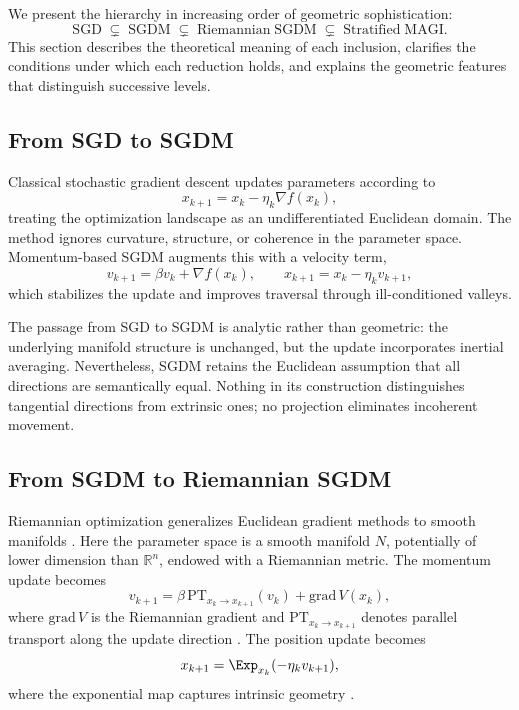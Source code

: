 \documentclass[12pt]{article}
\begin{document}
We present the hierarchy in increasing order of geometric sophistication:
\[
\mathrm{SGD}
\;\subsetneq\;
\mathrm{SGDM}
\;\subsetneq\;
\mathrm{Riemannian\;SGDM}
\;\subsetneq\;
\mathrm{Stratified\;MAGI}.
\]
This section describes the theoretical meaning of each inclusion, clarifies the conditions under which each reduction holds, and explains the geometric features that distinguish successive levels.

\subsection*{From SGD to SGDM}

Classical stochastic gradient descent updates parameters according to
\[
x_{k+1} = x_k - \eta_k \nabla f(x_k),
\]
treating the optimization landscape as an undifferentiated Euclidean domain. The method ignores curvature, structure, or coherence in the parameter space. Momentum-based SGDM \citep{Polyak1964,Sutskever2013} augments this with a velocity term,
\[
v_{k+1} = \beta v_k + \nabla f(x_k),
\qquad
x_{k+1} = x_k - \eta_k v_{k+1},
\]
which stabilizes the update and improves traversal through ill-conditioned valleys.

The passage from SGD to SGDM is analytic rather than geometric: the underlying manifold structure is unchanged, but the update incorporates inertial averaging. Nevertheless, SGDM retains the Euclidean assumption that all directions are semantically equal. Nothing in its construction distinguishes tangential directions from extrinsic ones; no projection eliminates incoherent movement.

\subsection*{From SGDM to Riemannian SGDM}

Riemannian optimization generalizes Euclidean gradient methods to smooth manifolds \citep{Absil2008,Boumal2023}. Here the parameter space is a smooth manifold $N$, potentially of lower dimension than $\mathbb{R}^n$, endowed with a Riemannian metric. The momentum update becomes
\[
v_{k+1} = \beta \,\mathrm{PT}_{x_k \to x_{k+1}}(v_k) + \mathrm{grad}\, V(x_k),
\]
where $\mathrm{grad}\,V$ is the Riemannian gradient and $\mathrm{PT}_{x_k \to x_{k+1}}$ denotes parallel transport along the update direction \citep{LeeRiemannian2018}. The position update becomes
\[
x_{k+1} = \Exp_{x_k}(-\eta_k v_{k+1}),
\]
where the exponential map captures intrinsic geometry \citep{CheegerEbin1975}.
\end{document}
